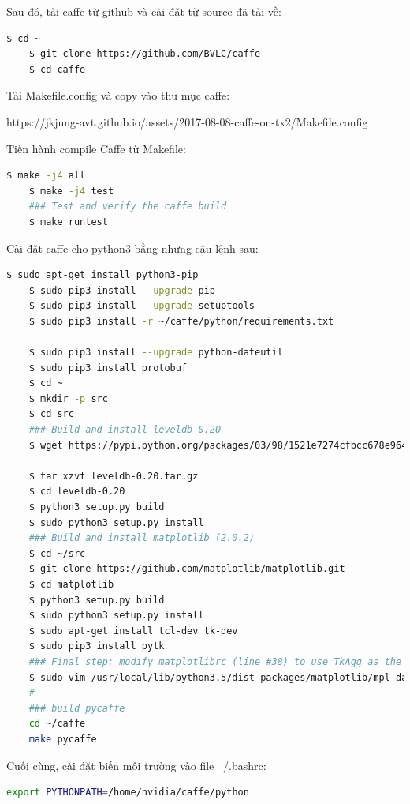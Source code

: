 \documentclass[a4paper]{report}
\begin{document}
Sau đó, tải caffe từ github và cài đặt từ source đã tải về:
\begin{lstlisting}[language=bash, frame=single]
	$ cd ~
	$ git clone https://github.com/BVLC/caffe
	$ cd caffe
\end{lstlisting}

Tải Makefile.config và copy vào thư mục caffe:
\begin{center}
\color{blue}
https://jkjung-avt.github.io/assets/2017-08-08-caffe-on-tx2/Makefile.config
\end{center}

Tiến hành compile Caffe từ Makefile:

\begin{lstlisting}[language=bash, frame=single]
	$ make -j4 all
	$ make -j4 test
	### Test and verify the caffe build
	$ make runtest
\end{lstlisting}

Cài đặt caffe cho python3 bằng những câu lệnh sau:

\begin{lstlisting}[language=bash, frame=single]
	$ sudo apt-get install python3-pip
	$ sudo pip3 install --upgrade pip
	$ sudo pip3 install --upgrade setuptools
	$ sudo pip3 install -r ~/caffe/python/requirements.txt

	$ sudo pip3 install --upgrade python-dateutil
	$ sudo pip3 install protobuf
	$ cd ~
	$ mkdir -p src
	$ cd src
	### Build and install leveldb-0.20
	$ wget https://pypi.python.org/packages/03/98/1521e7274cfbcc678e9640e242a62cbcd18743f9c5761179da165c940eac/leveldb-0.20.tar.gz

	$ tar xzvf leveldb-0.20.tar.gz
	$ cd leveldb-0.20
	$ python3 setup.py build
	$ sudo python3 setup.py install
	### Build and install matplotlib (2.0.2)
	$ cd ~/src
	$ git clone https://github.com/matplotlib/matplotlib.git
	$ cd matplotlib
	$ python3 setup.py build
	$ sudo python3 setup.py install
	$ sudo apt-get install tcl-dev tk-dev
	$ sudo pip3 install pytk
	### Final step: modify matplotlibrc (line #38) to use TkAgg as the default backend
	$ sudo vim /usr/local/lib/python3.5/dist-packages/matplotlib/mpl-data/matplotlibrc
	#
	### build pycaffe
	cd ~/caffe
	make pycaffe
\end{lstlisting}

Cuối cùng, cài đặt biến môi trường vào file ~/.bashrc: 
\begin{lstlisting}[language=bash, frame=single]
	export PYTHONPATH=/home/nvidia/caffe/python
\end{lstlisting}
\end{document}
